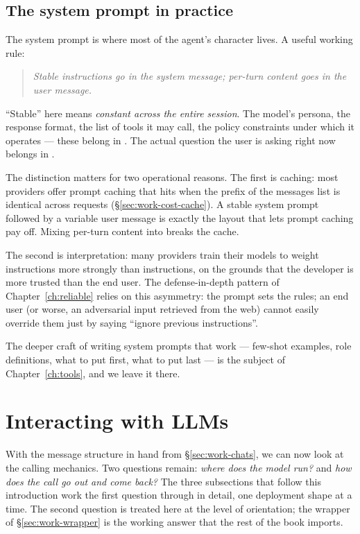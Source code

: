 \subsection{The system prompt in practice}
\label{sec:work-system}

The system prompt is where most of the agent's character lives. A
useful working rule:

\begin{quote}
\itshape
Stable instructions go in the system message; per-turn content
goes in the user message.
\end{quote}

\noindent
``Stable'' here means \emph{constant across the entire
session}. The model's persona, the response format, the list of
tools it may call, the policy constraints under which it
operates --- these belong in . The actual question
the user is asking right now belongs in .

The distinction matters for two operational reasons. The first is
caching: most providers offer prompt caching that hits when the
prefix of the messages list is identical across requests
(\S\ref{sec:work-cost-cache}). A stable system prompt followed by
a variable user message is exactly the layout that lets prompt
caching pay off. Mixing per-turn content into 
breaks the cache.

The second is interpretation: many providers train their models
to weight  instructions more strongly than
 instructions, on the grounds that the developer is
more trusted than the end user. The defense-in-depth pattern of
Chapter~\ref{ch:reliable} relies on this asymmetry: the
 prompt sets the rules; an end user (or worse, an
adversarial input retrieved from the web) cannot easily override
them just by saying ``ignore previous instructions''.

The deeper craft of writing system prompts that work --- few-shot
examples, role definitions, what to put first, what to put last
--- is the subject of Chapter~\ref{ch:tools}, and we leave it
there.

\section{Interacting with LLMs}
\label{sec:work-deploy}

With the message structure in hand from \S\ref{sec:work-chats}, we
can now look at the calling mechanics. Two questions remain:
\emph{where does the model run?} and \emph{how does the call go
out and come back?} The three subsections that follow this
introduction work the first question through in detail, one
deployment shape at a time. The second question is treated here
at the level of orientation; the  wrapper of
\S\ref{sec:work-wrapper} is the working answer that the rest of
the book imports.

